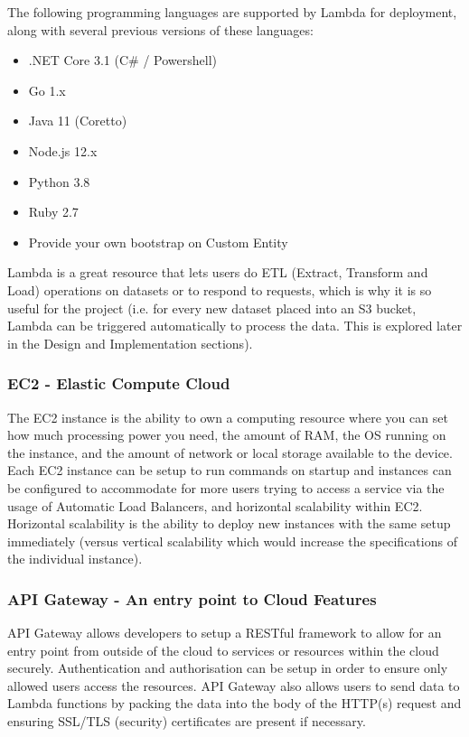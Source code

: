 The following programming languages are supported by Lambda for deployment, along with several previous versions of these languages:
\begin{itemize}
    \item .NET Core 3.1 (C\# / Powershell)
    \item Go 1.x
    \item Java 11 (Coretto)
    \item Node.js 12.x
    \item Python 3.8
    \item Ruby 2.7
    \item Provide your own bootstrap on Custom Entity
\end{itemize}
Lambda is a great resource that lets users do ETL (Extract, Transform and Load) operations on datasets or to respond to requests, which is why it is so useful for the project (i.e. for every new dataset placed into an S3 bucket, Lambda can be triggered automatically to process the data. This is explored later in the Design and Implementation sections).

\subsubsection{EC2 - Elastic Compute Cloud}
The EC2 instance is the ability to own a computing resource where you can set how much processing power you need, the amount of RAM, the OS running on the instance, and the amount of network or local storage available to the device. Each EC2 instance can be setup to run commands on startup and instances can be configured to accommodate for more users trying to access a service via the usage of Automatic Load Balancers, and horizontal scalability within EC2. Horizontal scalability is the ability to deploy new instances with the same setup immediately (versus vertical scalability which would increase the specifications of the individual instance).

\subsubsection{API Gateway - An entry point to Cloud Features}
API Gateway allows developers to setup a RESTful framework \cite{ch1_2_api_gateway} to allow for an entry point from outside of the cloud to services or resources within the cloud securely. Authentication and authorisation can be setup in order to ensure only allowed users access the resources. API Gateway also allows users to send data to Lambda functions by packing the data into the body of the HTTP(s) request  and ensuring SSL/TLS (security) certificates are present if necessary.

